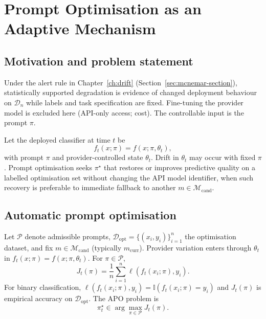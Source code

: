 \chapter{Prompt Optimisation as an Adaptive Mechanism}
\label{chap:prompt-optimisation}

\section{Motivation and problem statement}
\label{sec:motivation-prompt-adaptation}

Under the alert rule in Chapter~\ref{ch:drift} (Section~\ref{sec:mcnemar-section}), statistically supported degradation is evidence of changed deployment behaviour on $\mathcal{D}_n$ while labels and task specification are fixed. Fine-tuning the provider model is excluded here (API-only access; cost). The controllable input is the prompt $\pi$.

Let the deployed classifier at time $t$ be
\begin{equation}
    f_t(x;\pi) = f(x;\pi,\theta_t),
\end{equation}
with prompt $\pi$ and provider-controlled state $\theta_t$. Drift in $\theta_t$ may occur with fixed $\pi$. Prompt optimisation seeks $\pi^\star$ that restores or improves predictive quality on a labelled optimisation set without changing the API model identifier, when such recovery is preferable to immediate fallback to another $m\in\mathcal{M}_{\mathrm{cand}}$.

\section{Automatic prompt optimisation}
\label{sec:general-formulation-apo}

Let $\mathcal{P}$ denote admissible prompts, $\mathcal{D}_{\mathrm{opt}}=\{(x_i,y_i)\}_{i=1}^n$ the optimisation dataset, and fix $m \in \mathcal{M}_{\mathrm{cand}}$ (typically $m_{\mathrm{curr}}$). Provider variation enters through $\theta_t$ in $f_t(x;\pi)=f(x;\pi,\theta_t)$. For $\pi \in \mathcal{P}$,
\begin{equation}
    J_t(\pi)
    =
    \frac{1}{n}\sum_{i=1}^{n}
    \ell\!\left(f_t(x_i;\pi),y_i\right).
\end{equation}
For binary classification, $\ell(f_t(x_i;\pi),y_i)=\mathbb{I}(f_t(x_i;\pi)=y_i)$ and $J_t(\pi)$ is empirical accuracy on $\mathcal{D}_{\mathrm{opt}}$. The APO problem is
\begin{equation}
    \pi_t^\star
    \in
    \arg\max_{\pi \in \mathcal{P}} J_t(\pi).
\end{equation}

